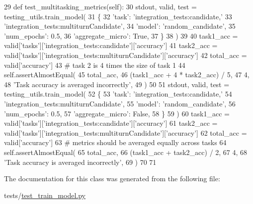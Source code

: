 \begin{DoxyCode}
29     \textcolor{keyword}{def }test\_multitasking\_metrics(self):
30         stdout, valid, test = testing\_utils.train\_model(
31             \{
32                 \textcolor{stringliteral}{'task'}: \textcolor{stringliteral}{'integration\_tests:candidate,'}
33                 \textcolor{stringliteral}{'integration\_tests:multiturnCandidate'},
34                 \textcolor{stringliteral}{'model'}: \textcolor{stringliteral}{'random\_candidate'},
35                 \textcolor{stringliteral}{'num\_epochs'}: 0.5,
36                 \textcolor{stringliteral}{'aggregate\_micro'}: \textcolor{keyword}{True},
37             \}
38         )
39 
40         task1\_acc = valid[\textcolor{stringliteral}{'tasks'}][\textcolor{stringliteral}{'integration\_tests:candidate'}][\textcolor{stringliteral}{'accuracy'}]
41         task2\_acc = valid[\textcolor{stringliteral}{'tasks'}][\textcolor{stringliteral}{'integration\_tests:multiturnCandidate'}][\textcolor{stringliteral}{'accuracy'}]
42         total\_acc = valid[\textcolor{stringliteral}{'accuracy'}]
43         \textcolor{comment}{# task 2 is 4 times the size of task 1}
44         self.assertAlmostEqual(
45             total\_acc,
46             (task1\_acc + 4 * task2\_acc) / 5,
47             4,
48             \textcolor{stringliteral}{'Task accuracy is averaged incorrectly'},
49         )
50 
51         stdout, valid, test = testing\_utils.train\_model(
52             \{
53                 \textcolor{stringliteral}{'task'}: \textcolor{stringliteral}{'integration\_tests:candidate,'}
54                 \textcolor{stringliteral}{'integration\_tests:multiturnCandidate'},
55                 \textcolor{stringliteral}{'model'}: \textcolor{stringliteral}{'random\_candidate'},
56                 \textcolor{stringliteral}{'num\_epochs'}: 0.5,
57                 \textcolor{stringliteral}{'aggregate\_micro'}: \textcolor{keyword}{False},
58             \}
59         )
60         task1\_acc = valid[\textcolor{stringliteral}{'tasks'}][\textcolor{stringliteral}{'integration\_tests:candidate'}][\textcolor{stringliteral}{'accuracy'}]
61         task2\_acc = valid[\textcolor{stringliteral}{'tasks'}][\textcolor{stringliteral}{'integration\_tests:multiturnCandidate'}][\textcolor{stringliteral}{'accuracy'}]
62         total\_acc = valid[\textcolor{stringliteral}{'accuracy'}]
63         \textcolor{comment}{# metrics should be averaged equally across tasks}
64         self.assertAlmostEqual(
65             total\_acc,
66             (task1\_acc + task2\_acc) / 2,
67             4,
68             \textcolor{stringliteral}{'Task accuracy is averaged incorrectly'},
69         )
70 
71 
\end{DoxyCode}


The documentation for this class was generated from the following file\+:\begin{DoxyCompactItemize}
\item 
tests/\hyperlink{test__train__model_8py}{test\+\_\+train\+\_\+model.\+py}\end{DoxyCompactItemize}
